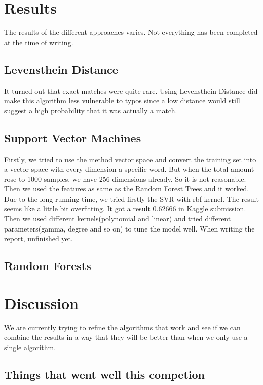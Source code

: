 \documentclass{article}
\begin{document}
\section{Results}

The results of the different approaches varies. Not everything has been completed at the time of writing.

\subsection{Levensthein Distance}
It turned out that exact matches were quite rare. Using Levensthein Distance did make this algorithm less vulnerable to typos since a low distance would still suggest a high probability that it was actually a match.

\subsection{Support Vector Machines}
Firstly, we tried to use the method vector space and convert the training set into a vector space with every dimension a specific word. But when the total amount rose to 1000 samples, we have 256 dimensions already. So it is not reasonable. Then we used the features as same as the Random Forest Trees and it worked. Due to the long running time, we tried firstly the SVR with rbf kernel. The result seems like a little bit overfitting. It got a result 0.62666 in Kaggle submission. Then we used different kernels(polynomial and linear) and tried different parameters(gamma, degree and so on) to tune the model well. When writing the report, unfinished yet.

\subsection{Random Forests}

\section{Discussion}

We are currently trying to refine the algorithms that work and see if we can combine the results in a way that they will be better than when we only use a single algorithm.\\

\subsection{Things that went well this competion}
\end{document}
